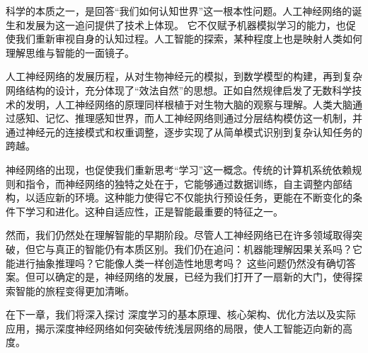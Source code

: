 科学的本质之一，是回答“我们如何认知世界”这一根本性问题。人工神经网络的诞生和发展为这一追问提供了技术上体现。
它不仅赋予机器模拟学习的能力，也促使我们重新审视自身的认知过程。人工智能的探索，某种程度上也是映射人类如何理解思维与智能的一面镜子。

人工神经网络的发展历程，从对生物神经元的模拟，到数学模型的构建，再到复杂网络结构的设计，充分体现了“效法自然”的思想。正如自然规律启发了无数科学技术的发明，人工神经网络的原理同样根植于对生物大脑的观察与理解。人类大脑通过感知、记忆、推理感知世界，而人工神经网络则通过分层结构模仿这一机制，并通过神经元的连接模式和权重调整，逐步实现了从简单模式识别到复杂认知任务的跨越。

神经网络的出现，也促使我们重新思考“学习”这一概念。传统的计算机系统依赖规则和指令，而神经网络的独特之处在于，它能够通过数据训练，自主调整内部结构，以适应新的环境。这种能力使得它不仅能执行预设任务，更能在不断变化的条件下学习和进化。这种自适应性，正是智能最重要的特征之一。

然而，我们仍然处在理解智能的早期阶段。尽管人工神经网络已在许多领域取得突破，但它与真正的智能仍有本质区别。我们仍在追问：机器能理解因果关系吗？它能进行抽象推理吗？它能像人类一样创造性地思考吗？ 这些问题仍然没有确切答案。但可以确定的是，神经网络的发展，已经为我们打开了一扇新的大门，使得探索智能的旅程变得更加清晰。

在下一章，我们将深入探讨 深度学习的基本原理、核心架构、优化方法以及实际应用，揭示深度神经网络如何突破传统浅层网络的局限，使人工智能迈向新的高度。

\nocite{*}
\printbibliography[heading=bibintoc, title=\ebibname]

\newpage